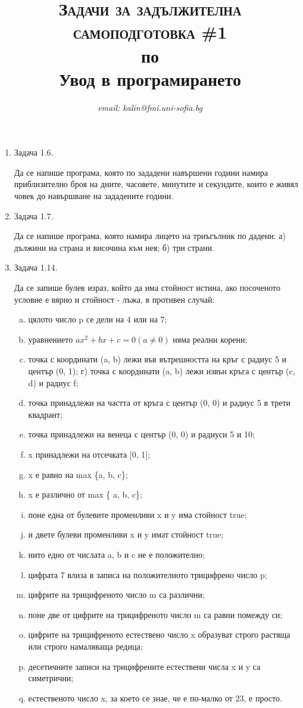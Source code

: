 \documentclass[12pt,a4paper]{article}
\author{\textit{email: kalin@fmi.uni-sofia.bg}}
\title{\textsc{Задачи за задължителна самоподготовка \#1} \\
по \\
Увод в програмирането}
\begin{document}
\maketitle


\begin{enumerate}
	\item Задача 1.6.

	Да се напише програма, която по зададени навършени години намира приблизително броя на дните, часовете, минутите и секундите, които е живял човек до навършване на зададените години.

	\item Задача 1.7.

	 Да се напише програма, която намира лицето на триъгълник по дадени: а) дължини на страна и височина към нея; б) три страни.

	 \item Задача 1.14.

	 Да се запише булев израз, който да има стойност истина, ако посоченото условие е вярно и стойност - лъжа, в противен случай:


	 \begin{enumerate}[a)] %
		\item цялото число p се дели на 4 или на 7;
		\item уравнението $ax^2 + bx + c = 0 (a \neq 0)$ няма реални корени;
		\item точка с координати (a, b) лежи във вътрешността на кръг с радиус 5 и център (0, 1); г) точка с координати (a, b) лежи извън кръга с център (c, d) и радиус f;
		\item точка принадлежи на частта от кръга с център (0, 0) и радиус 5 в трети квадрант;
		\item точка принадлежи на венеца с център (0, 0) и радиуси 5 и 10;
		\item x принадлежи на отсечката [0, 1];
		\item x е равно на max \{a, b, c\};
		\item x е различно от max \{ a, b, c\};
		\item поне една от булевите променливи x и y има стойност true;
		\item и двете булеви променливи x и y имат стойност true;
		\item нито едно от числата a, b и c не е положително;
		\item цифрата 7 влиза в записа на положителното трицифрено число p;
		\item цифрите на трицифреното число m са различни;
		\item поне две от цифрите на трицифреното число m са равни помежду си;
		\item цифрите на трицифреното естествено число x образуват строго растяща или строго намаляваща редица;
		\item десетичните записи на трицифрените естествени числа x и y са симетрични;
		\item естественото число x, за което се знае, че е по-малко от 23, е просто.


\end{enumerate}
\end{enumerate}
\end{document}
